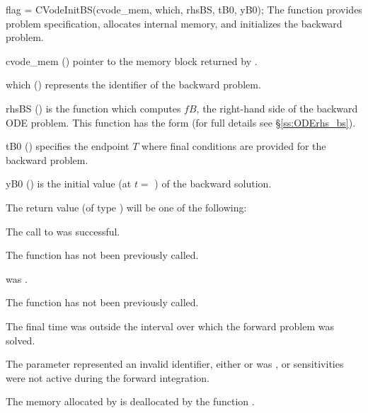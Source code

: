 {
  flag = CVodeInitBS(cvode\_mem, which, rhsBS, tB0, yB0);
}
{
  The function  provides problem specification, allocates internal memory,
  and initializes the backward problem.
}
{
  \begin{args}
  \item[cvode\_mem] ()
    pointer to the {\cvodes} memory block returned by .
  \item[which] ()
    represents the identifier of the backward problem.
  \item[rhsBS] ()
    is the {\CC} function which computes $fB$, the right-hand side of the
    backward ODE problem. This function has the form
    (for full details see \S\ref{ss:ODErhs_bs}).
  \item[tB0] ()
    specifies the endpoint $T$ where final conditions are provided for the
    backward problem.
  \item[yB0] ()
    is the initial value (at $t =$ ) of the backward solution.
  \end{args}
}
{
  The return value  (of type ) will be one of the following:
  \begin{args}
  \item[\Id{CV\_SUCCESS}]
    The call to  was successful.
  \item[\Id{CV\_NO\_MALLOC}]
    The function  has not been previously called.
  \item[\Id{CV\_MEM\_NULL}]
     was .
  \item[\Id{CV\_NO\_ADJ}]
    The function  has not been previously called.
  \item[\Id{CV\_BAD\_TB0}]
    The final time  was outside the interval over which the forward problem
    was solved.
  \item[\Id{CV\_ILL\_INPUT}]
    The parameter  represented an invalid identifier,
    either  or  was ,
    or sensitivities were not active during the forward integration.
  \end{args}
}
{
  The memory allocated by  is deallocated by the function
  .
}

